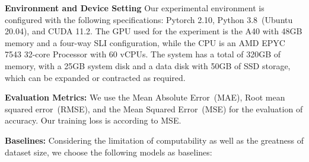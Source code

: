 \documentclass[lettersize,journal]{IEEEtran}
\begin{document}
\textbf{Environment and Device Setting}
Our experimental environment is configured with the following specifications: Pytorch 2.10, Python 3.8~(Ubuntu 20.04), and CUDA 11.2. The GPU used for the experiment is the A40 with 48GB memory and a four-way SLI configuration, while the CPU is an AMD EPYC 7543 32-core Processor with 60 vCPUs. The system has a total of 320GB of memory, with a 25GB system disk and a data disk with 50GB of SSD storage, which can be expanded or contracted as required.

 \textbf{Evaluation Metrics:}
We use the Mean Absolute Error~(MAE), Root mean squared error~(RMSE), and the Mean Squared Error~(MSE) for the evaluation of accuracy. Our training loss is according to MSE.

\color{blue}

\textbf{Baselines:}
Considering the limitation of computability as well as the greatness of dataset size, we choose the following models as baselines:
\end{document}
